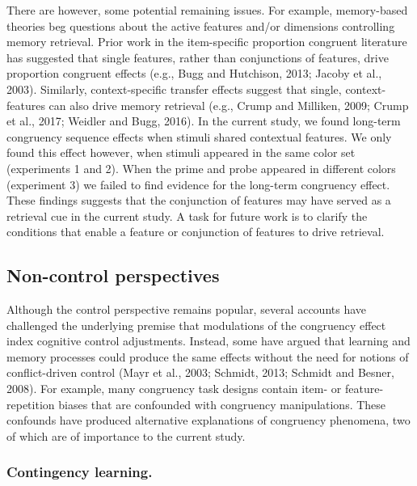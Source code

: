 \documentclass[]{DissertateCUNY}
\begin{document}
There are however, some potential remaining issues. For example,
memory-based theories beg questions about the active features and/or
dimensions controlling memory retrieval. Prior work in the item-specific
proportion congruent literature has suggested that single features,
rather than conjunctions of features, drive proportion congruent effects
(e.g., Bugg and Hutchison, 2013; Jacoby et al., 2003). Similarly,
context-specific transfer effects suggest that single, context-features
can also drive memory retrieval (e.g., Crump and Milliken, 2009; Crump
et al., 2017; Weidler and Bugg, 2016). In the current study, we found
long-term congruency sequence effects when stimuli shared contextual
features. We only found this effect however, when stimuli appeared in
the same color set (experiments 1 and 2). When the prime and probe
appeared in different colors (experiment 3) we failed to find evidence
for the long-term congruency effect. These findings suggests that the
conjunction of features may have served as a retrieval cue in the
current study. A task for future work is to clarify the conditions that
enable a feature or conjunction of features to drive retrieval.

\hypertarget{non-control-perspectives}{%
\subsection{Non-control perspectives}\label{non-control-perspectives}}

Although the control perspective remains popular, several accounts have
challenged the underlying premise that modulations of the congruency
effect index cognitive control adjustments. Instead, some have argued
that learning and memory processes could produce the same effects
without the need for notions of conflict-driven control (Mayr et al.,
2003; Schmidt, 2013; Schmidt and Besner, 2008). For example, many
congruency task designs contain item- or feature-repetition biases that
are confounded with congruency manipulations. These confounds have
produced alternative explanations of congruency phenomena, two of which
are of importance to the current study.

\hypertarget{contingency-learning.}{%
\subsubsection{Contingency learning.}\label{contingency-learning.}}
\end{document}
